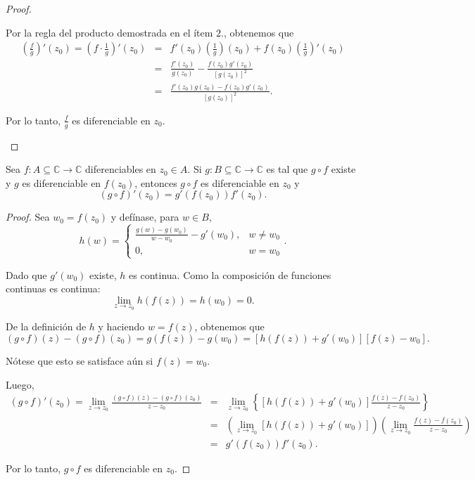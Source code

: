 \begin{proof}
\begin{enumerate}
Por la regla del producto demostrada en el ítem $2.$, obtenemos que
\begin{eqnarray*}
\left( \frac{f}{g} \right)'(z_0) = \left( f \cdot \frac{1}{g} \right)'(z_0) &=& f'(z_0) \left( \frac{1}{g} \right) (z_0) + f(z_0) \left( \frac{1}{g} \right)'(z_0) \\
&=& \frac{f'(z_0)}{g(z_0)} - \frac{f(z_0)g'(z_0)}{[g(z_0)]^2} \\
&=& \frac{f'(z_0) g(z_0) -f(z_0)g'(z_0) }{[g(z_0)]^2}.
\end{eqnarray*}

Por lo tanto, $\frac{f}{g}$ es diferenciable en $z_0$.
\end{enumerate}
\end{proof}

\begin{teorema}
Sea $f: A \subseteq \mathbb{C} \rightarrow \mathbb{C}$  diferenciables en $z_0 \in A$. Si $g: B \subseteq \mathbb{C} \rightarrow \mathbb{C}$ es tal que $g \circ f$ existe y $g$ es diferenciable en $f(z_0)$, entonces $g \circ f$ es diferenciable en $z_0$ y 
$$(g \circ f)'(z_0) = g'(f(z_0)) f'(z_0).$$
\end{teorema}

\begin{proof}
Sea $w_0 = f(z_0)$ y defínase, para $w \in B$,
$$h(w) = \left\{ \begin{array}{cl}
\frac{g(w)-g(w_0)}{w-w_0} - g'(w_0),& w \neq w_0 \\
0 ,& w = w_0
\end{array} \right. .$$

Dado que $g'(w_0)$ existe, $h$ es continua. Como la composición de funciones continuas es continua:
$$\lim_{z \to z_0} h(f(z)) = h(w_0) =  0.$$

De la definición de $h$ y haciendo $w = f(z)$, obtenemos que 
$$(g \circ f)(z) - (g\circ f)(z_0) = g(f(z)) - g(w_0) = [h(f(z)) +g'(w_0)][f(z)-w_0].$$

Nótese que esto se satisface aún si $f(z) = w_0$.

Luego, 
\begin{eqnarray*}
(g \circ f)' (z_0) = \lim_{z \to z_0} \frac{(g \circ f)(z) - (g\circ f)(z_0)}{z-z_0}  &=& \lim_{z \to z_0} \left\{ [h(f(z)) +g'(w_0)] \frac{f(z) - f(z_0)}{z-z_0}  \right\}\\
&=& \left( \lim_{z \to z_0}[ h(f(z)) +g'(w_0)] \right) \left( \lim_{z\to z_0} \frac{f(z) - f(z_0)}{z-z_0} \right) \\
&=& g'(f(z_0)) f'(z_0) . 
\end{eqnarray*}

Por lo tanto, $g\circ f$ es diferenciable en $z_0$.

\end{proof}

